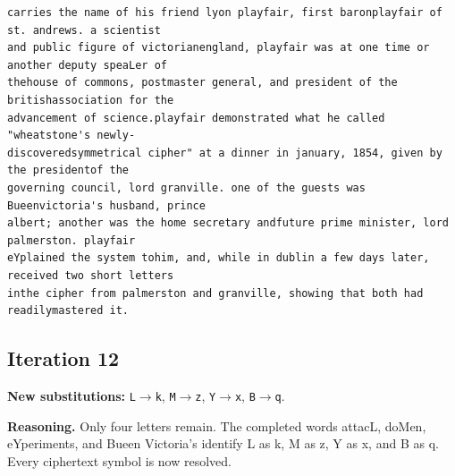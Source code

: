 \documentclass[12pt,a4paper]{article}
\begin{document}
\begin{lstlisting}[style=ciphertext,caption={Complete text after iteration 11}]
carries the name of his friend lyon playfair, first baronplayfair of st. andrews. a scientist
and public figure of victorianengland, playfair was at one time or another deputy speaLer of
thehouse of commons, postmaster general, and president of the britishassociation for the
advancement of science.playfair demonstrated what he called "wheatstone's newly-
discoveredsymmetrical cipher" at a dinner in january, 1854, given by the presidentof the
governing council, lord granville. one of the guests was Bueenvictoria's husband, prince
albert; another was the home secretary andfuture prime minister, lord palmerston. playfair
eYplained the system tohim, and, while in dublin a few days later, received two short letters
inthe cipher from palmerston and granville, showing that both had readilymastered it.
\end{lstlisting}
\subsection{Iteration 12}

\noindent\textbf{New substitutions:} \texttt{L}$\rightarrow$\texttt{k}, \texttt{M}$\rightarrow$\texttt{z}, \texttt{Y}$\rightarrow$\texttt{x}, \texttt{B}$\rightarrow$\texttt{q}.\par
\smallskip
\noindent\textbf{Reasoning.} Only four letters remain. The completed words attacL, doMen, eYperiments, and Bueen Victoria's identify L as k, M as z, Y as x, and B as q. Every ciphertext symbol is now resolved.
\end{document}
